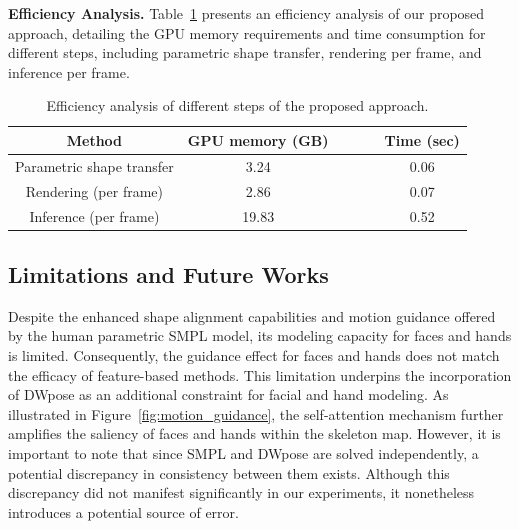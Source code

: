 \textbf{Efficiency Analysis.}
Table~\ref{tab:efficiency} presents an efficiency analysis of our proposed approach, detailing the GPU memory requirements and time consumption for different steps, including parametric shape transfer, rendering per frame, and inference per frame.

\begin{table}[!t]
\centering
\begin{tabular}{c|ccccc}
\hline
Method          & GPU memory (GB) & & & & Time (sec) \\ \hline
Parametric shape transfer    &   3.24     & & & & 0.06 \\
Rendering (per frame) &  2.86    & & & & 0.07 \\
Inference (per frame)  & 19.83       & & & & 0.52 \\\hline
\end{tabular} 
\vspace{1mm}
\caption{Efficiency analysis of different steps of the proposed approach.} 
\label{tab:efficiency}
\vspace{-4mm}  
\end{table}

\subsection{Limitations and Future Works}
Despite the enhanced shape alignment capabilities and motion guidance offered by the human parametric SMPL model, its modeling capacity for faces and hands is limited. 
Consequently, the guidance effect for faces and hands does not match the efficacy of feature-based methods. This limitation underpins the incorporation of DWpose as an additional constraint for facial and hand modeling. 
As illustrated in Figure~\ref{fig:motion_guidance}, the self-attention mechanism further amplifies the saliency of faces and hands within the skeleton map. 
However, it is important to note that since SMPL and DWpose are solved independently, a potential discrepancy in consistency between them exists. 
Although this discrepancy did not manifest significantly in our experiments, it nonetheless introduces a potential source of error.